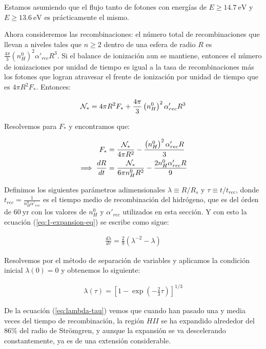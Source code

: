 Estamos asumiendo que el flujo tanto de fotones con energías de $E\geq 14.7\mathrm{~eV}$ y $E\geq 13.6\mathrm{~eV}$ es prácticamente el mismo.

Ahora consideremos las recombinaciones: el número total de recombinaciones que llevan a niveles tales que $n \geq 2$ dentro de una esfera de radio $R$ es $\frac{4\pi}{3}\left(n^0_H\right)^2\alpha'_{rec}R^3$. Si el balance de ionización aun se mantiene, entonces el número de ionizaciones por unidad de tiempo es igual a la tasa de recombinaciones más los fotones que logran atravesar el frente de ionización por unidad de tiempo que es $4\pi R^2 F_*$. Entonces:

\begin{align}
  \mathcal{N}_* = 4\pi R^2 F_* + \frac{4\pi}{3}\left(n^0_H\right)^2\alpha'_{rec}R^3
\end{align}

Resolvemos para $F_*$ y encontramos que:

\begin{align}
  F_* &= \frac{\mathcal{N}_*}{4\pi R^2} - \frac{\left(n^0_H\right)^2\alpha'_{rec} R}{3} \\
  \implies \frac{dR}{dt} &= \frac{\mathcal{N}_*}{6\pi n^0_H R^2} - \frac{2n^0_H \alpha'_{rec} R}{9} \label{eq:1-expansion-eq} 
\end{align}

Definimos los siguientes parámetros adimensionales $\lambda \equiv R/R_s$ y $\tau \equiv t/t_{rec}$, donde $t_{rec} = \frac{1}{n^0_H \alpha'_{rec}}$ es el tiempo medio de recombinación del hidrógeno, que es del órden de $60\mathrm{~yr}$ con los valores de $n^0_H$ y $\alpha'_{rec}$ utilizados en esta sección. Y con esto la ecuación (\ref{eq:1-expansion-eq}) se escribe como sigue:

\begin{align}
  \frac{d\lambda}{d\tau} = \frac{2}{9}\left(\lambda^{-2} - \lambda\right) \label{eq:d-lambda-tau}
\end{align}

Resolvemos por el método de separación de variables y aplicamos la condición inicial $\lambda(0) = 0$ y obtenemos lo siguiente:

\begin{align}
  \lambda(\tau) = \left[1 - \exp\left(-\frac{2}{3}\tau\right)\right]^{1/3} \label{eq:lambda-tau}
\end{align}
 
De la ecuación (\ref{eq:lambda-tau}) vemos que cuando han pasado una y media veces del tiempo de recombinación,  la región $HII$ se ha expandido alrededor del $86\mathrm{\%}$ del radio de Strömgren, y aunque la expansión se va descelerando constantemente, ya es de una extensión considerable.

